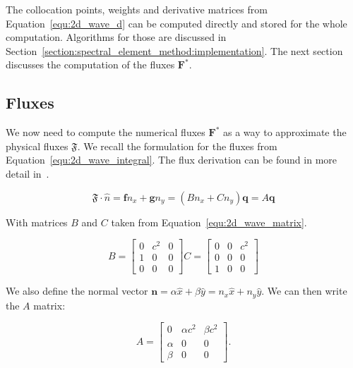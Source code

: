 The collocation points, weights and derivative matrices from Equation~\ref{equ:2d_wave_d} can be
computed directly and stored for the whole computation. Algorithms for those are discussed in
Section~\ref{section:spectral_element_method:implementation}. The next section discusses the
computation of the fluxes $\mathbf{F}^*$.

\subsection{Fluxes} \label{subsection:spectral_element_method:dg_sem:fluxes}

We now need to compute the numerical fluxes $\mathbf{F}^*$ as a way to approximate the physical
fluxes $\mathfrak{F}$. We recall the formulation for the fluxes from
Equation~\ref{equ:2d_wave_integral}. The flux derivation can be found in more detail
in~\cite{Kopriva2009}.

\begin{equation} \label{equ:physical_fluxes}
	\mathfrak{F} \cdot \widehat{n} = \mathbf{f} n_x + \mathbf{g} n_y = (B n_x + C n_y) \mathbf{q} = A \mathbf{q}
\end{equation}

\noindent
With matrices $B$ and $C$ taken from Equation~\ref{equ:2d_wave_matrix}.

\begin{equation}
	B = \begin{bmatrix}
        0 & c^2 & 0 \\ 
        1 & 0 & 0 \\ 
        0 & 0 & 0 
	\end{bmatrix}
	C = \begin{bmatrix}
        0 & 0 & c^2\\ 
        0 & 0 & 0 \\ 
        1 & 0 & 0
	\end{bmatrix}
\end{equation}

We also define the normal vector $\mathbf{n} = \alpha \widehat{x} + \beta \widehat{y} = n_x
\widehat{x} + n_y \widehat{y}$. We can then write the $A$ matrix:

\begin{equation}
    A = \begin{bmatrix}
        0 & \alpha c^2 & \beta c^2 \\ 
        \alpha & 0 & 0 \\ 
        \beta & 0 & 0 
	\end{bmatrix}.
\end{equation}


